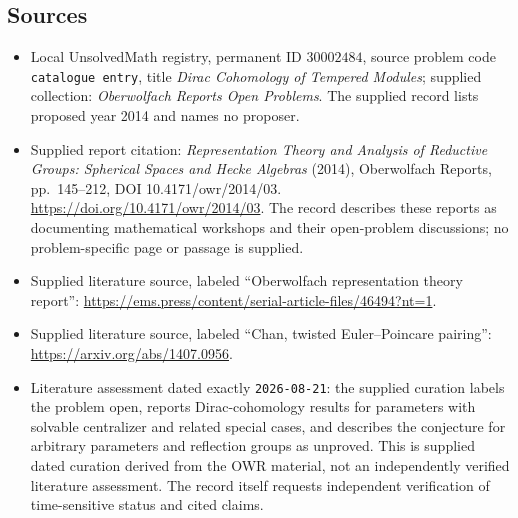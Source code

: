 \documentclass[11pt]{article}
\begin{document}
\subsection{Sources}
\begin{itemize}
\item Local UnsolvedMath registry, permanent ID \(30002484\), source problem code \texttt{catalogue entry}, title \emph{Dirac Cohomology of Tempered Modules}; supplied collection: \emph{Oberwolfach Reports Open Problems}. The supplied record lists proposed year 2014 and names no proposer.
\item Supplied report citation: \emph{Representation Theory and Analysis of Reductive Groups: Spherical Spaces and Hecke Algebras} (2014), Oberwolfach Reports, pp.~145--212, DOI 10.4171/owr/2014/03. \url{https://doi.org/10.4171/owr/2014/03}. The record describes these reports as documenting mathematical workshops and their open-problem discussions; no problem-specific page or passage is supplied.
\item Supplied literature source, labeled ``Oberwolfach representation theory report'': \url{https://ems.press/content/serial-article-files/46494?nt=1}.
\item Supplied literature source, labeled ``Chan, twisted Euler--Poincare pairing'': \url{https://arxiv.org/abs/1407.0956}.
\item Literature assessment dated exactly \texttt{2026-08-21}: the supplied curation labels the problem open, reports Dirac-cohomology results for parameters with solvable centralizer and related special cases, and describes the conjecture for arbitrary parameters and reflection groups as unproved. This is supplied dated curation derived from the OWR material, not an independently verified literature assessment. The record itself requests independent verification of time-sensitive status and cited claims.
\end{itemize}
\end{document}
